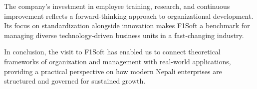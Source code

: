 \documentclass[12pt, a4paper]{report}
\begin{document}
The company’s investment in employee training, research, and continuous improvement reflects a forward-thinking approach to organizational development. Its focus on standardization alongside innovation makes F1Soft a benchmark for managing diverse technology-driven business units in a fast-changing industry.

In conclusion, the visit to F1Soft has enabled us to connect theoretical frameworks of organization and management with real-world applications, providing a practical perspective on how modern Nepali enterprises are structured and governed for sustained growth.
\end{document}
